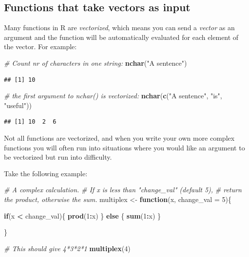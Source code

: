 \documentclass[]{book}
\newenvironment{Shaded}{\begin{snugshade}}{\end{snugshade}}
\newcommand{\CommentTok}[1]{\textcolor[rgb]{0.56,0.35,0.01}{\textit{#1}}}
\newcommand{\ControlFlowTok}[1]{\textcolor[rgb]{0.13,0.29,0.53}{\textbf{#1}}}
\newcommand{\DataTypeTok}[1]{\textcolor[rgb]{0.13,0.29,0.53}{#1}}
\newcommand{\DecValTok}[1]{\textcolor[rgb]{0.00,0.00,0.81}{#1}}
\newcommand{\KeywordTok}[1]{\textcolor[rgb]{0.13,0.29,0.53}{\textbf{#1}}}
\newcommand{\NormalTok}[1]{#1}
\newcommand{\OperatorTok}[1]{\textcolor[rgb]{0.81,0.36,0.00}{\textbf{#1}}}
\newcommand{\StringTok}[1]{\textcolor[rgb]{0.31,0.60,0.02}{#1}}
\begin{document}
\hypertarget{functions-that-take-vectors-as-input}{%
\subsection{Functions that take vectors as input}\label{functions-that-take-vectors-as-input}}

Many functions in R are \emph{vectorized}, which means you can send a \emph{vector} as an argument and the function will be automatically evaluated for each element of the vector. For example:

\begin{Shaded}
\begin{Highlighting}[]
\CommentTok{# Count nr of characters in one string:}
\KeywordTok{nchar}\NormalTok{(}\StringTok{"A sentence"}\NormalTok{)}
\end{Highlighting}
\end{Shaded}

\begin{verbatim}
## [1] 10
\end{verbatim}

\begin{Shaded}
\begin{Highlighting}[]
\CommentTok{# the first argument to nchar() is vectorized:}
\KeywordTok{nchar}\NormalTok{(}\KeywordTok{c}\NormalTok{(}\StringTok{"A sentence"}\NormalTok{, }\StringTok{"is"}\NormalTok{, }\StringTok{"useful"}\NormalTok{))}
\end{Highlighting}
\end{Shaded}

\begin{verbatim}
## [1] 10  2  6
\end{verbatim}

Not all functions are vectorized, and when you write your own more complex functions you will often run into situations where you would like an argument to be vectorized but run into difficulty.

Take the following example:

\begin{Shaded}
\begin{Highlighting}[]
\CommentTok{# A complex calculation. }
\CommentTok{# If x is less than "change_val" (default 5), }
\CommentTok{# return the product, otherwise the sum.}
\NormalTok{multiplex <-}\StringTok{ }\ControlFlowTok{function}\NormalTok{(x, }\DataTypeTok{change_val =} \DecValTok{5}\NormalTok{)\{}
  
  \ControlFlowTok{if}\NormalTok{(x }\OperatorTok{<}\StringTok{ }\NormalTok{change_val)\{}
    \KeywordTok{prod}\NormalTok{(}\DecValTok{1}\OperatorTok{:}\NormalTok{x)}
\NormalTok{  \} }\ControlFlowTok{else}\NormalTok{ \{}
    \KeywordTok{sum}\NormalTok{(}\DecValTok{1}\OperatorTok{:}\NormalTok{x)}
\NormalTok{  \}}
  
\NormalTok{\}}

\CommentTok{# This should give 4*3*2*1}
\KeywordTok{multiplex}\NormalTok{(}\DecValTok{4}\NormalTok{)}
\end{Highlighting}
\end{Shaded}
\end{document}
